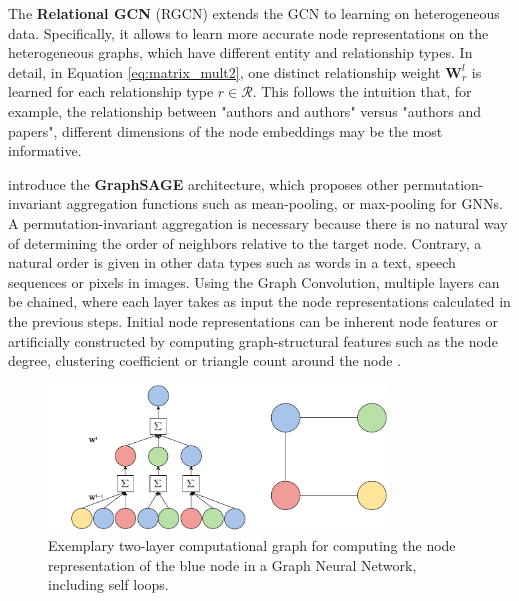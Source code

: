 The \textbf{Relational GCN} (RGCN) \parencite{schlichtkrull2018modeling} extends the GCN to learning on heterogeneous data. Specifically, it allows to learn more accurate node representations on the heterogeneous graphs, which have different entity and relationship types. In detail, in  Equation \eqref{eq:matrix_mult2}, one distinct relationship weight $\mathbf{W}_r^l$ is learned for each relationship type $r \in \mathcal{R}$. This follows the intuition that, for example, the relationship between "authors and authors" versus "authors and papers", different dimensions of the node embeddings may be the most informative. 
 
\textcite{hamilton2017inductive} introduce the \textbf{GraphSAGE} architecture, which proposes other permutation-invariant aggregation functions such as mean-pooling, or max-pooling for GNNs. A permutation-invariant aggregation is necessary because there is no natural way of determining the order of neighbors relative to the target node. Contrary, a natural order is given in other data types such as words in a text, speech sequences or pixels in images. Using the Graph Convolution, multiple layers can be chained, where each layer takes as input the node representations calculated in the previous steps. Initial node representations can be inherent node features or artificially constructed by computing graph-structural features such as the node degree, clustering coefficient or triangle count around the node \parencite{hamilton2017inductive}. 

\begin{figure}
    \centering
    \includegraphics[width=0.8\textwidth]{img/nodecomputationgraph.drawio (5).pdf}
    \caption[Computational graph for computing a node representation]{Exemplary two-layer computational graph for computing the node representation of the blue node in a Graph Neural Network, including self loops.}
    \label{fig:compgraph}
\end{figure}

